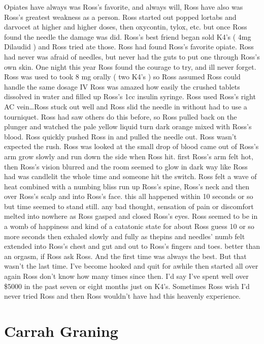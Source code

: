 \documentclass[12pt]{book}
\begin{document}
Opiates have always was Ross's favorite, and always will, Ross have also was Ross's greatest weakness as a person. Ross started out popped lortabs and darvocet at higher and higher doses, then oxycontin, tylox, etc. but once Ross found the needle the damage was did. Ross's best friend began sold K4's ( 4mg Dilaudid ) and Ross tried ate those. Ross had found Ross's favorite opiate. Ross had never was afraid of needles, but never had the guts to put one through Ross's own skin. One night this year Ross found the courage to try, and ill never forget. Ross was used to took 8 mg orally ( two K4's ) so Ross assumed Ross could handle the same dosage IV Ross was amazed how easily the crushed tablets dissolved in water and filled up Ross's 1cc insulin syringe. Ross used Ross's right AC vein\ldots Ross stuck out well and Ross slid the needle in without had to use a tourniquet. Ross had saw others do this before, so Ross pulled back on the plunger and watched the pale yellow liquid turn dark orange mixed with Ross's blood. Ross quickly pushed Ross in and pulled the needle out. Ross wasn't expected the rush. Ross was looked at the small drop of blood came out of Ross's arm grow slowly and run down the side when Ross hit. first Ross's arm felt hot, then Ross's vision blurred and the room seemed to glow in dark way like Ross had was candlelit the whole time and someone hit the switch. Ross felt a wave of heat combined with a numbing bliss run up Ross's spine, Ross's neck and then over Ross's scalp and into Ross's face. this all happened within 10 seconds or so but time seemed to stand still. any bad thought, sensation of pain or discomfort melted into nowhere as Ross gasped and closed Ross's eyes. Ross seemed to be in a womb of happiness and kind of a catatonic state for about Ross guess 10 or so more seconds then exhaled slowly and fully as thepins and needles' numb felt extended into Ross's chest and gut and out to Ross's fingers and toes. better than an orgasm, if Ross ask Ross. And the first time was always the best. But that wasn't the last time. I've become hooked and quit for awhile then started all over again Ross don't know how many times since then. I'd say I've spent well over \$5000 in the past seven or eight months just on K4's. Sometimes Ross wish I'd never tried Ross and then Ross wouldn't have had this heavenly experience.



\chapter{Carrah Graning}
\end{document}
